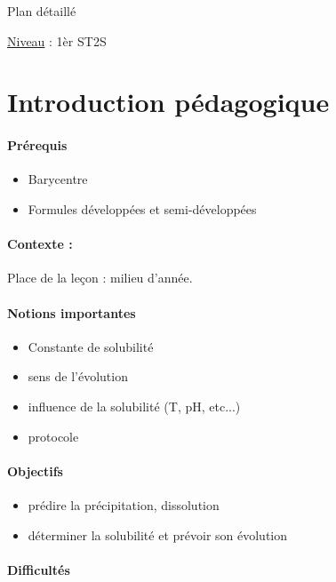 \begin{reportBlock}{Plan détaillé}

\underline{Niveau} : 1èr ST2S \\

\section*{Introduction pédagogique}


\paragraph*{Prérequis}
\begin{itemize}
\item Barycentre
\item Formules développées et semi-développées
\end{itemize}

\paragraph*{Contexte :}
Place de la leçon : milieu d'année.

\paragraph*{Notions importantes}

\begin{itemize}
\item Constante de solubilité
\item sens de l'évolution
\item influence de la solubilité (T, pH, etc...)
\item protocole 
\end{itemize}

\paragraph*{Objectifs}

\begin{itemize}
\item prédire la précipitation, dissolution
\item déterminer la solubilité et prévoir son évolution
\end{itemize}

\paragraph*{Difficultés}


\end{reportBlock}
